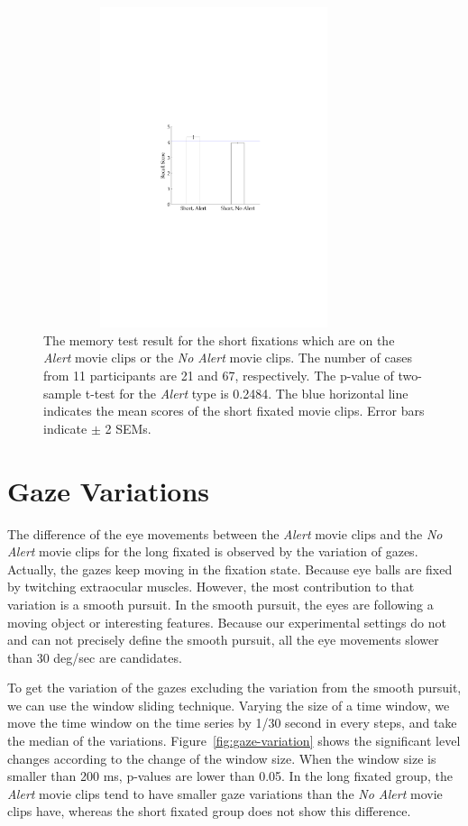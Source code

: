 \documentclass[oneside,master]{snueethesis}
\begin{document}
\begin{figure}
  \centerline{\includegraphics[width=100mm,height=94mm,trim=48mm 100mm 52mm 95mm]{./eps/memtest_short.pdf}}
  \caption[The memory test result for the short fixations which are on the Alert movie clips or the No Alert movie clips]{The memory test result for the short fixations which are on the \textit{Alert} movie clips or the \textit{No Alert} movie clips. The number of cases from 11 participants are 21 and 67, respectively. The p-value of two-sample t-test for the \textit{Alert} type is 0.2484. The blue horizontal line indicates the mean scores of the short fixated movie clips. Error bars indicate $\pm$ 2 SEMs.}
  \label{fig:memtest-short}
\end{figure}


\section{Gaze Variations}
\label{subsec:gaze-variations}

The difference of the eye movements between the \textit{Alert} movie clips and the \textit{No Alert} movie clips for the long fixated is observed by the variation of gazes. Actually, the gazes keep moving in the fixation state. Because eye balls are fixed by twitching extraocular muscles. However, the most contribution to that variation is a smooth pursuit. In the smooth pursuit, the eyes are following a moving object or interesting features. Because our experimental settings do not and can not precisely define the smooth pursuit, all the eye movements slower than 30 deg/sec are candidates. 

To get the variation of the gazes excluding the variation from the smooth pursuit, we can use the window sliding technique. Varying the size of a time window, we move the time window on the time series by 1/30 second in every steps, and take the median of the variations. Figure~\ref{fig:gaze-variation} shows the significant level changes according to the change of the window size. When the window size is smaller than 200 ms, p-values are lower than 0.05. In the long fixated group, the \textit{Alert} movie clips tend to have smaller gaze variations than the \textit{No Alert} movie clips have, whereas the short fixated group does not show this difference.
\end{document}
